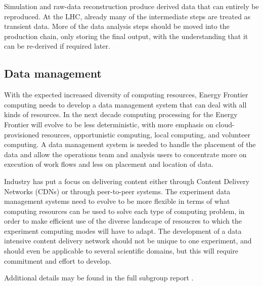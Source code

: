 Simulation and raw-data reconstruction produce derived data that can
entirely be reproduced. At the LHC, already many of the intermediate steps are
treated as transient data.   More of the data analysis steps should be moved
into the production chain, only storing the final output, with the
understanding that it can be re-derived if required later.

\subsection{Data management}
With the expected increased diversity of computing resources, Energy Frontier computing
needs to develop a data management system that can deal with all kinds of
resources.   In the next decade computing processing for the Energy Frontier will evolve to
be less deterministic, with more emphasis on cloud-provisioned resources,
opportunistic computing, local computing, and volunteer computing.   A data
management system is needed to handle the placement of the data and allow the
operations team and analysis users to concentrate more on execution of work
flows and less on placement and location of data.

Industry has put a focus on delivering content either through Content
Delivery Networks (CDNs) or through peer-to-peer systems.  The experiment data
management systems need to evolve to be more flexible in terms of what 
computing resources can be used to solve each type of computing problem,
in order to make efficient use of the diverse landscape of resoucres to which
the experiment computing modes will have to adapt.
The development of a data intensive content delivery network should not be
unique to one experiment, and should even be applicable to several scientific
domains, but this will require commitment and effort to develop.

Additional details may be found in the full subgroup report 
\cite{Fisk:2014lia}.

